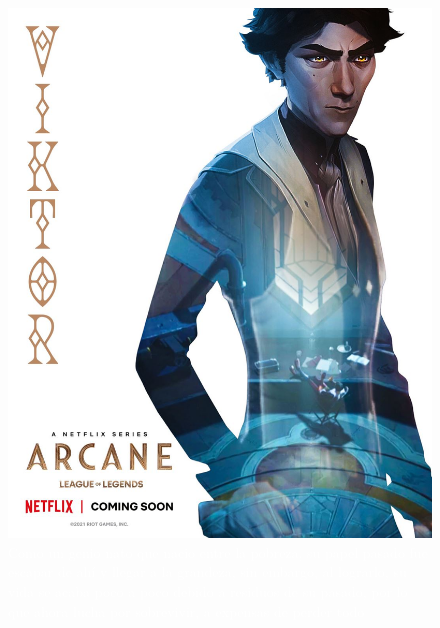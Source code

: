 \documentclass[11pt,a5paper]{article}
\begin{document}
\begin{figure}
    \includegraphics[scale=0.09, angle=18]{Pelicula. Imagenes usadas/Viktor, personaje favorito junto a otro.jpg}
    \caption{\textcolor{white}{\small{Como un genio nato que nacio entre la pobreza, su papel pasado fue escapar de ahí y llegar a la grandeza, sin embargo, al lograrlo, su vida se acaba poco a poco debido a residuos de su pasado, por lo que ahora lucha por sobrevivir, a expensas de perder todo}}}
    \label{fig:my_label}
\end{figure}
\end{document}
